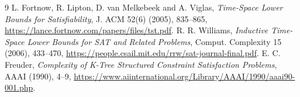 \documentclass[11pt]{article}
\begin{document}
\begin{thebibliography}{9}
 L. Fortnow, R. Lipton, D. van Melkebeek and
A. Viglas, \emph{Time-Space Lower Bounds for Satisfiability},
J. ACM 52(6) (2005), 835--865,
\url{https://lance.fortnow.com/papers/files/tst.pdf}.
 R. R. Williams,
\emph{Inductive Time-Space Lower Bounds for SAT and Related
Problems}, Comput. Complexity 15 (2006), 433--470,
\url{https://people.csail.mit.edu/rrw/sat-journal-final.pdf}.
 E. C. Freuder,
\emph{Complexity of K-Tree Structured Constraint Satisfaction Problems},
AAAI (1990), 4--9,
\url{https://www.aiinternational.org/Library/AAAI/1990/aaai90-001.php}.
\end{thebibliography}
\end{document}
